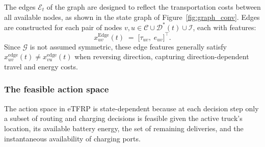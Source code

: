 \documentclass[a4paper,fleqn]{cas-sc}
\begin{document}
The edges $\mathcal{E}_t$ of the graph are designed to reflect the transportation costs between all available nodes, as shown in the state graph of Figure~\ref{fig:graph_conv}.
Edges are constructed for each pair of nodes $v,u\in\mathcal{C}\cup\mathcal{D}^*(t)\cup\mathcal{I}$, each with features:
\begin{equation}
x^{\mathrm{Edge}}_{uv}(t)\;=\;\big[\tau_{uv},\; e_{uv}\big]^\top.
\label{eq:edge_features}
\end{equation}
Since $\mathcal{G}$ is not assumed symmetric, these edge features generally satisfy $x^{\mathrm{edge}}_{uv}(t)\neq x^{\mathrm{edge}}_{vu}(t)$ when reversing direction, capturing direction-dependent travel and energy costs.

\subsubsection{The feasible action space}\label{sec:feasible_actions}

The action space in eTFRP is state-dependent because at each decision step only a subset of routing and charging decisions is feasible given the active truck's location, its available battery energy, the set of remaining deliveries, and the instantaneous availability of charging ports. 
\end{document}
